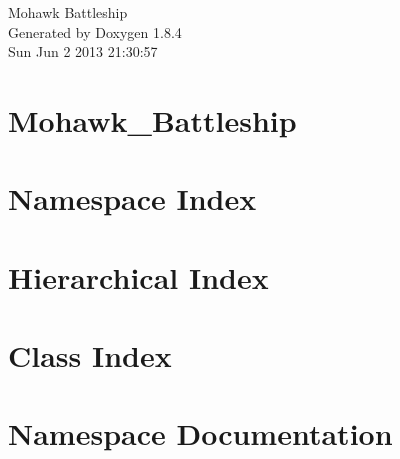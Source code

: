 \documentclass[twoside]{book}
\newcommand{\clearemptydoublepage}{%
  \newpage{\pagestyle{empty}\cleardoublepage}%
}
\begin{document}
\hypersetup{pageanchor=false}
\begin{titlepage}
\vspace*{7cm}
\begin{center}%
{\Large Mohawk Battleship }\\
\vspace*{1cm}
{\large Generated by Doxygen 1.8.4}\\
\vspace*{0.5cm}
{\small Sun Jun 2 2013 21:30:57}\\
\end{center}
\end{titlepage}
\clearemptydoublepage
\tableofcontents
\clearemptydoublepage
{}
\hypersetup{pageanchor=true}

\chapter{Mohawk\-\_\-\-Battleship}
\label{md_README}
\hypertarget{md_README}{}

\chapter{Namespace Index}

\chapter{Hierarchical Index}

\chapter{Class Index}

\chapter{Namespace Documentation}















\end{document}

